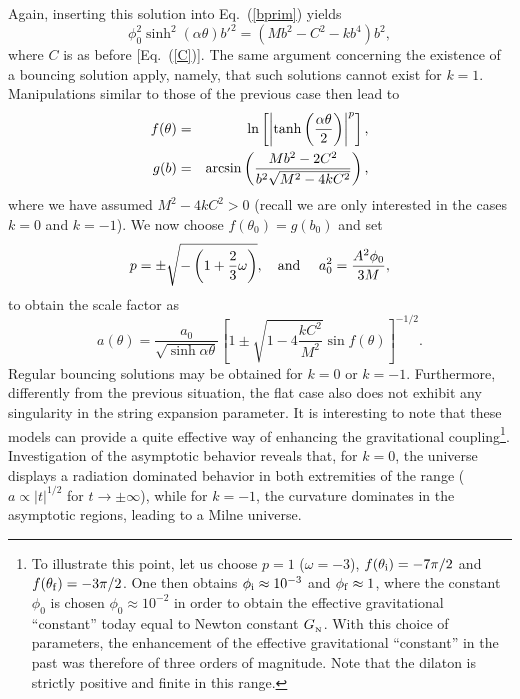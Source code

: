 \documentclass[a4paper,aps,twocolumn,prd,showpacs,nofootinbib]{revtex4}
\newcommand{\GN}{G_{_{\rm N}}}
\begin{document}
Again, inserting this solution into Eq.~(\ref{bprim}) yields
\begin{equation}
\phi_0^2 \sinh^2(\alpha\theta) b'^2 = (M b^2 -C^2 - k b^4 ) b^2,
\label{bAA}
\end{equation}
where $C$ is as before [Eq.~(\ref{C})]. The same argument concerning
the existence of a bouncing solution apply, namely, that such
solutions cannot exist for $k=1$. Manipulations similar to those of
the previous case then lead to
\begin{eqnarray}
f(\theta) &=& \ln\left[\left| \tanh
\left(\frac{\alpha\theta}{2}\right) \right|^p \right],\\ g(b) &=&
\arcsin \left( {M b^2 - 2 C^2\over b^2 \sqrt{M^2-4kC^2} }\right) ,
\end{eqnarray}
where we have assumed $M^2-4kC^2 > 0$ (recall we are only interested
in the cases $k=0$ and $k=-1$). We now choose $f(\theta_0) = g(b_0)$
and set
\begin{equation}
p = \pm \sqrt{-\left( 1 + \frac{2}{3}\omega\right)}, \ \ \hbox{ and }
\ \ \ a_0^2 = {A^2 \phi_0\over 3 M},
\end{equation}
to obtain the scale factor as
\begin{equation}
a(\theta) = \frac{a_0}{\sqrt{\sinh\alpha\theta}}\left[1 \pm \sqrt{1 -
4\displaystyle{\frac{kC^2}{M^2}}}\sin f(\theta)\right]^{-1/2}.
\end{equation}
Regular bouncing solutions may be obtained for $k = 0$ or $k= - 1$.
Furthermore, differently from the previous situation, the flat case
also does not exhibit any singularity in the string expansion
parameter. It is interesting to note that these models can provide a
quite effective way of enhancing the gravitational
coupling\footnote{To illustrate this point, let us choose $p = 1$
($\omega = - 3$), $f(\theta_{\rm i})=-7\pi/2$ and $f(\theta_{\rm
f})=-3\pi/2$. One then obtains $\phi_{\rm i}\approx 10^{-3}$ and
$\phi_{\rm f}\approx 1$, where the constant $\phi_0$ is chosen
$\phi_0\approx 10^{-2}$ in order to obtain the effective gravitational
``constant'' today equal to Newton constant $\GN$.  With this choice
of parameters, the enhancement of the effective gravitational
``constant'' in the past was therefore of three orders of magnitude.
Note that the dilaton is strictly positive and finite in this
range.}. Investigation of the asymptotic behavior reveals that, for $k
= 0$, the universe displays a radiation dominated behavior in both
extremities of the range ($a\propto |t|^{1/2}$ for $t \rightarrow \pm
\infty$), while for $k = - 1$, the curvature dominates in the
asymptotic regions, leading to a Milne universe.
\end{document}
